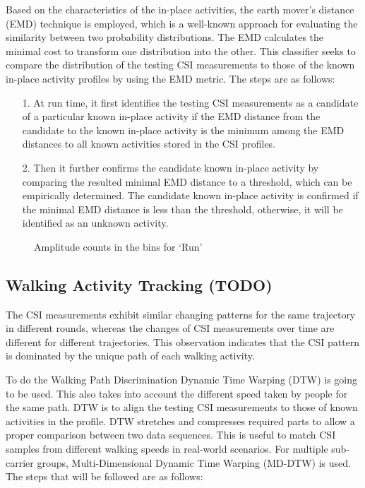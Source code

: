 \documentclass[letterpaper]{article}
\begin{document}
Based on the characteristics of the in-place activities, the earth mover’s distance (EMD) \cite{c4} technique is employed, which is a well-known approach for evaluating the similarity between two probability distributions. The EMD calculates the minimal cost to transform one distribution into the other. This classifier seeks to compare the distribution of the testing CSI measurements to those of the known in-place activity profiles by using the EMD metric. The steps are as follows:

\begin{enumerate}
	\item[1.] At run time, it first identifies the testing CSI measurements as a candidate of a particular known in-place activity if the EMD distance from the candidate to the known in-place activity is the minimum among the EMD distances to all known activities stored in the CSI profiles. 
	
	\item[2.] Then it further confirms the candidate known in-place activity by comparing the resulted minimal EMD distance to a threshold, which can be empirically determined. The candidate known in-place activity is confirmed if the minimal EMD distance is less than the threshold, otherwise, it will be identified as an unknown activity. 
\end{enumerate}

\begin{figure}%
	\centering
	\qquad
	\caption{Amplitude counts in the bins for `Run'}%
	\label{fig:example}%
\end{figure}

\subsection{Walking Activity Tracking (TODO)}

The CSI measurements exhibit similar changing patterns for the same trajectory in different rounds, whereas the changes of CSI measurements over time are different for different trajectories. This observation indicates that the CSI pattern is dominated by the unique path of each walking activity.

To do the Walking Path Discrimination Dynamic Time Warping (DTW) is going to be used. This also takes into account the different speed taken by people for the same path. DTW is to align the testing CSI measurements to those of known activities in the profile. DTW stretches and compresses required parts to allow a proper comparison between two data sequences. This is useful to match CSI samples from different walking speeds in real-world scenarios. For multiple sub-carrier groups, Multi-Dimensional Dynamic Time Warping (MD-DTW) is used. The steps that will be followed are as follows:
\end{document}
